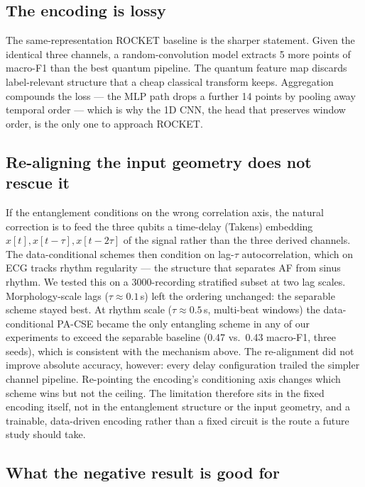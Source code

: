 \documentclass[conference,compsoc]{IEEEtran}
\begin{document}
\subsection{The encoding is lossy}

The same-representation ROCKET baseline is the sharper statement. Given the identical three channels, a random-convolution model extracts 5 more points of macro-F1 than the best quantum pipeline. The quantum feature map discards label-relevant structure that a cheap classical transform keeps. Aggregation compounds the loss --- the MLP path drops a further 14 points by pooling away temporal order --- which is why the 1D CNN, the head that preserves window order, is the only one to approach ROCKET.

\subsection{Re-aligning the input geometry does not rescue it}

If the entanglement conditions on the wrong correlation axis, the natural correction is to feed the three qubits a time-delay (Takens) embedding $x[t], x[t-\tau], x[t-2\tau]$ of the signal rather than the three derived channels. The data-conditional schemes then condition on lag-$\tau$ autocorrelation, which on ECG tracks rhythm regularity --- the structure that separates AF from sinus rhythm. We tested this on a 3000-recording stratified subset at two lag scales. Morphology-scale lags ($\tau\approx0.1$\,s) left the ordering unchanged: the separable scheme stayed best. At rhythm scale ($\tau\approx0.5$\,s, multi-beat windows) the data-conditional PA-CSE became the only entangling scheme in any of our experiments to exceed the separable baseline (0.47 vs.\ 0.43 macro-F1, three seeds), which is consistent with the mechanism above. The re-alignment did not improve absolute accuracy, however: every delay configuration trailed the simpler channel pipeline. Re-pointing the encoding's conditioning axis changes which scheme wins but not the ceiling. The limitation therefore sits in the fixed encoding itself, not in the entanglement structure or the input geometry, and a trainable, data-driven encoding rather than a fixed circuit is the route a future study should take.

\subsection{What the negative result is good for}
\end{document}
